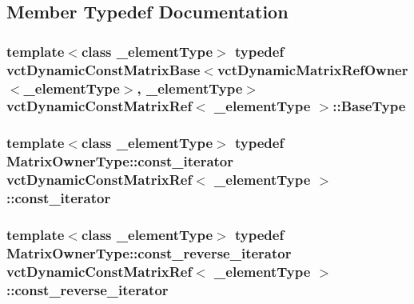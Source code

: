 \subsection{Member Typedef Documentation}
\hypertarget{classvct_dynamic_const_matrix_ref_a0e57e53f6e3703384598d165b430f0e8}{}
\subsubsection[{Base\+Type}]{\setlength{\rightskip}{0pt plus 5cm}template$<$class \+\_\+element\+Type$>$ typedef {\bf vct\+Dynamic\+Const\+Matrix\+Base}$<${\bf vct\+Dynamic\+Matrix\+Ref\+Owner}$<$\+\_\+element\+Type$>$, \+\_\+element\+Type$>$ {\bf vct\+Dynamic\+Const\+Matrix\+Ref}$<$ \+\_\+element\+Type $>$\+::{\bf Base\+Type}}\label{classvct_dynamic_const_matrix_ref_a0e57e53f6e3703384598d165b430f0e8}
\hypertarget{classvct_dynamic_const_matrix_ref_ad5222f7776fb22e1fbf36980d1b2022b}{}
\subsubsection[{const\+\_\+iterator}]{\setlength{\rightskip}{0pt plus 5cm}template$<$class \+\_\+element\+Type$>$ typedef {\bf Matrix\+Owner\+Type\+::const\+\_\+iterator} {\bf vct\+Dynamic\+Const\+Matrix\+Ref}$<$ \+\_\+element\+Type $>$\+::{\bf const\+\_\+iterator}}\label{classvct_dynamic_const_matrix_ref_ad5222f7776fb22e1fbf36980d1b2022b}
\hypertarget{classvct_dynamic_const_matrix_ref_aab47ab9afbf2163300fb700fa5240550}{}
\subsubsection[{const\+\_\+reverse\+\_\+iterator}]{\setlength{\rightskip}{0pt plus 5cm}template$<$class \+\_\+element\+Type$>$ typedef {\bf Matrix\+Owner\+Type\+::const\+\_\+reverse\+\_\+iterator} {\bf vct\+Dynamic\+Const\+Matrix\+Ref}$<$ \+\_\+element\+Type $>$\+::{\bf const\+\_\+reverse\+\_\+iterator}}\label{classvct_dynamic_const_matrix_ref_aab47ab9afbf2163300fb700fa5240550}
\hypertarget{classvct_dynamic_const_matrix_ref_ab330f3add78ec03ac1f50861ae7d12ac}{}
